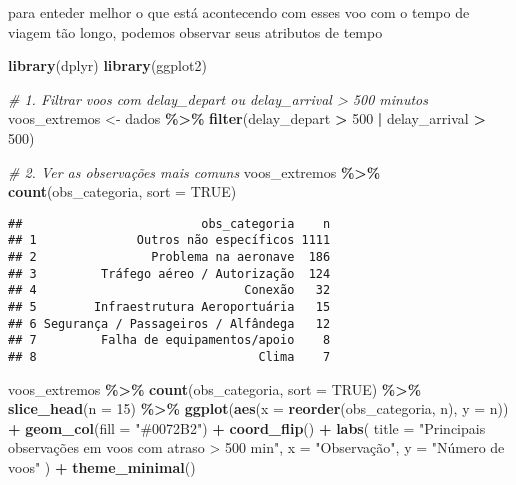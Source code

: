 \documentclass[
]{article}
\newenvironment{Shaded}{\begin{snugshade}}{\end{snugshade}}
\newcommand{\AttributeTok}[1]{\textcolor[rgb]{0.13,0.29,0.53}{#1}}
\newcommand{\CommentTok}[1]{\textcolor[rgb]{0.56,0.35,0.01}{\textit{#1}}}
\newcommand{\ConstantTok}[1]{\textcolor[rgb]{0.56,0.35,0.01}{#1}}
\newcommand{\DecValTok}[1]{\textcolor[rgb]{0.00,0.00,0.81}{#1}}
\newcommand{\FunctionTok}[1]{\textcolor[rgb]{0.13,0.29,0.53}{\textbf{#1}}}
\newcommand{\NormalTok}[1]{#1}
\newcommand{\OtherTok}[1]{\textcolor[rgb]{0.56,0.35,0.01}{#1}}
\newcommand{\SpecialCharTok}[1]{\textcolor[rgb]{0.81,0.36,0.00}{\textbf{#1}}}
\newcommand{\StringTok}[1]{\textcolor[rgb]{0.31,0.60,0.02}{#1}}
\begin{document}
para enteder melhor o que está acontecendo com esses voo com o tempo de
viagem tão longo, podemos observar seus atributos de tempo

\begin{Shaded}
\begin{Highlighting}[]
\FunctionTok{library}\NormalTok{(dplyr)}
\FunctionTok{library}\NormalTok{(ggplot2)}

\CommentTok{\# 1. Filtrar voos com delay\_depart ou delay\_arrival \textgreater{} 500 minutos}
\NormalTok{voos\_extremos }\OtherTok{\textless{}{-}}\NormalTok{ dados }\SpecialCharTok{\%\textgreater{}\%}
  \FunctionTok{filter}\NormalTok{(delay\_depart }\SpecialCharTok{\textgreater{}} \DecValTok{500} \SpecialCharTok{|}\NormalTok{ delay\_arrival }\SpecialCharTok{\textgreater{}} \DecValTok{500}\NormalTok{)}

\CommentTok{\# 2. Ver as observações mais comuns}
\NormalTok{voos\_extremos }\SpecialCharTok{\%\textgreater{}\%}
  \FunctionTok{count}\NormalTok{(obs\_categoria, }\AttributeTok{sort =} \ConstantTok{TRUE}\NormalTok{)}
\end{Highlighting}
\end{Shaded}

\begin{verbatim}
##                         obs_categoria    n
## 1              Outros não específicos 1111
## 2                Problema na aeronave  186
## 3         Tráfego aéreo / Autorização  124
## 4                             Conexão   32
## 5        Infraestrutura Aeroportuária   15
## 6 Segurança / Passageiros / Alfândega   12
## 7         Falha de equipamentos/apoio    8
## 8                               Clima    7
\end{verbatim}

\begin{Shaded}
\begin{Highlighting}[]
\NormalTok{voos\_extremos }\SpecialCharTok{\%\textgreater{}\%}
  \FunctionTok{count}\NormalTok{(obs\_categoria, }\AttributeTok{sort =} \ConstantTok{TRUE}\NormalTok{) }\SpecialCharTok{\%\textgreater{}\%}
  \FunctionTok{slice\_head}\NormalTok{(}\AttributeTok{n =} \DecValTok{15}\NormalTok{) }\SpecialCharTok{\%\textgreater{}\%}
  \FunctionTok{ggplot}\NormalTok{(}\FunctionTok{aes}\NormalTok{(}\AttributeTok{x =} \FunctionTok{reorder}\NormalTok{(obs\_categoria, n), }\AttributeTok{y =}\NormalTok{ n)) }\SpecialCharTok{+}
  \FunctionTok{geom\_col}\NormalTok{(}\AttributeTok{fill =} \StringTok{"\#0072B2"}\NormalTok{) }\SpecialCharTok{+}
  \FunctionTok{coord\_flip}\NormalTok{() }\SpecialCharTok{+}
  \FunctionTok{labs}\NormalTok{(}
    \AttributeTok{title =} \StringTok{"Principais observações em voos com atraso \textgreater{} 500 min"}\NormalTok{,}
    \AttributeTok{x =} \StringTok{"Observação"}\NormalTok{,}
    \AttributeTok{y =} \StringTok{"Número de voos"}
\NormalTok{  ) }\SpecialCharTok{+}
  \FunctionTok{theme\_minimal}\NormalTok{()}
\end{Highlighting}
\end{Shaded}
\end{document}
